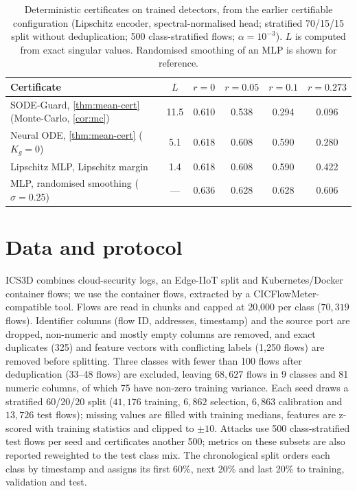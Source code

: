 \documentclass{article}
\theoremstyle{definition}
\begin{document}
\begin{table}[h]
\caption{Deterministic certificates on trained detectors, from the earlier
certifiable configuration (Lipschitz encoder, spectral-normalised head;
stratified 70/15/15 split without deduplication; 500 class-stratified flows;
$\alpha=10^{-3}$). $L$ is computed from exact singular values. Randomised
smoothing of an MLP is shown for reference.}
\label{tab:det-cert}
\centering\small
\begin{tabular}{lccccc}
\toprule
Certificate & $L$ & $r=0$ & $r=0.05$ & $r=0.1$ & $r=0.273$\\
\midrule
SODE-Guard, \cref{thm:mean-cert} (Monte-Carlo, \cref{cor:mc}) & 11.5 & 0.610 & 0.538 & 0.294 & 0.096\\
Neural ODE, \cref{thm:mean-cert} ($K_g=0$) & 5.1 & 0.618 & 0.608 & 0.590 & 0.280\\
Lipschitz MLP, Lipschitz margin & 1.4 & 0.618 & 0.608 & 0.590 & 0.422\\
MLP, randomised smoothing ($\sigma=0.25$) & --- & 0.636 & 0.628 & 0.628 & 0.606\\
\bottomrule
\end{tabular}
\end{table}

\section{Data and protocol}\label{app:data}
ICS3D \citep{anon_ics3d} combines cloud-security logs, an Edge-IIoT split and
Kubernetes/Docker container flows; we use the container flows, extracted by a
CICFlowMeter-compatible tool. Flows are read in chunks and capped at 20{,}000 per
class ($70{,}319$ flows). Identifier columns (flow ID, addresses, timestamp) and the
source port are dropped, non-numeric and mostly empty columns are removed, and
exact duplicates (325) and feature vectors with conflicting labels (1{,}250
flows) are removed before splitting. Three classes with fewer than 100 flows
after deduplication (33--48 flows) are excluded, leaving $68{,}627$ flows in 9
classes and 81 numeric columns, of which 75 have non-zero training variance.
Each seed draws a stratified 60/20/20 split ($41{,}176$ training,
$6{,}862$ selection, $6{,}863$ calibration and $13{,}726$ test flows); missing
values are filled with training medians, features are z-scored with training
statistics and clipped to $\pm10$. Attacks use 500 class-stratified test flows per
seed and certificates another 500; metrics on these subsets are also reported
reweighted to the test class mix. The chronological split orders each class by
timestamp and assigns its first 60\%, next 20\% and last 20\% to training,
validation and test.
\end{document}
